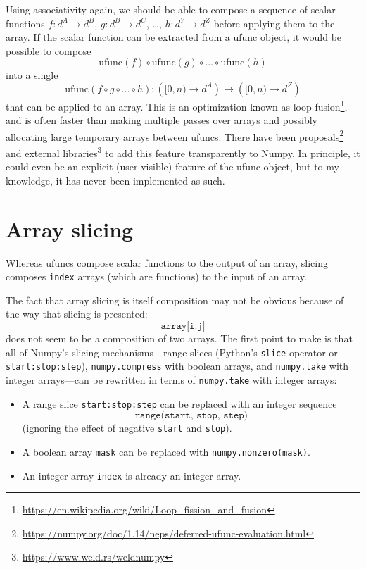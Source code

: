 \documentclass[12pt]{article}
\begin{document}
Using associativity again, we should be able to compose a sequence of scalar functions $f: d^A \to d^B$, $g: d^B \to d^C$, \ldots, $h: d^Y \to d^Z$ before applying them to the array. If the scalar function can be extracted from a ufunc object, it would be possible to compose
\[ \mbox{ufunc}(f) \circ \mbox{ufunc}(g) \circ \ldots \circ \mbox{ufunc}(h) \]
\noindent into a single
\[ \mbox{ufunc}(f \circ g \circ \ldots \circ h): \left([0, n) \to d^A\right) \to \left([0, n) \to d^Z\right) \]
\noindent that can be applied to an array. This is an optimization known as loop fusion\footnote{\url{https://en.wikipedia.org/wiki/Loop_fission_and_fusion}}, and is often faster than making multiple passes over arrays and possibly allocating large temporary arrays between ufuncs. There have been proposals\footnote{\url{https://numpy.org/doc/1.14/neps/deferred-ufunc-evaluation.html}} and external libraries\footnote{\url{https://www.weld.rs/weldnumpy}} to add this feature transparently to Numpy. In principle, it could even be an explicit (user-visible) feature of the ufunc object, but to my knowledge, it has never been implemented as such.

\section*{Array slicing}

Whereas ufuncs compose scalar functions to the output of an array, slicing composes \texttt{index} arrays (which are functions) to the input of an array.

The fact that array slicing is itself composition may not be obvious because of the way that slicing is presented:
\[ \texttt{array[i:j]} \]
\noindent does not seem to be a composition of two arrays. The first point to make is that all of Numpy's slicing mechanisms---range slices (Python's \texttt{slice} operator or \texttt{start:stop:step}), \texttt{numpy.compress} with boolean arrays, and \texttt{numpy.take} with integer arrays---can be rewritten in terms of \texttt{numpy.take} with integer arrays:
\begin{itemize}
\item A range slice \texttt{start:stop:step} can be replaced with an integer sequence
\[ \texttt{range(start, stop, step)} \]
(ignoring the effect of negative \texttt{start} and \texttt{stop}).
\item A boolean array \texttt{mask} can be replaced with \texttt{numpy.nonzero(mask)}.
\item An integer array \texttt{index} is already an integer array.
\end{itemize}
\end{document}
